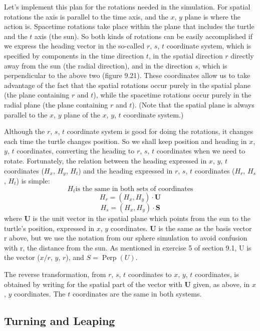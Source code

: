 \documentclass{book}
\begin{document}
Let's implement this plan for the rotations needed in the simulation.
For spatial rotations the axis is parallel to the time axis, and the $x$, $y$
plane is where the action is. Spacetime rotations take place within the
plane that includes the turtle and the $t$ axis (the sun). So both kinds of
rotations can be easily accomplished if we express the heading vector in
the so-called $r$, $s$, $t$ coordinate system, which is specified by components
in the time direction $t$, in the spatial direction $r$ directly away from the
sun (the radial direction), and in the direction $s$, which is perpendicular
to the above two (figure 9.21). These coordinates allow us to take advantage of the fact that the spatial rotations occur purely in the spatial
plane (the plane containing $r$ and $t$), while the spacetime rotations occur
purely in the radial plane (the plane containing $r$ and $t$). (Note that the
spatial plane is always parallel to the $x$, $y$ plane of the $x$, $y$, $t$ coordinate
system.)

Although the $r$, $s$, $t$ coordinate system is good for doing the rotations,
it changes each time the turtle changes position. So we shall keep
position and heading in $x$, $y$, $t$ coordinates, converting the heading to
$r$, $s$, $t$ coordinates when we need to rotate. Fortunately, the relation
between the heading expressed in $x$, $y$, $t$ coordinates ($H_x$, $H_y$, $H_t$) and
the heading expressed in $r$, $s$, $t$ coordinates ($H_r$, $H_s$, $H_t$) is simple:
$$H_t \text{is the same in both sets of coordinates}$$
$$H_r = (H_x, H_y) \cdot \mathbf{U}$$
$$H_s = (H_x, H_y) \cdot \mathbf{S}$$
where \textbf{U} is the unit vector in the spatial plane which points from the
sun to the turtle's position, expressed in $x$, $y$ coordinates. \textbf{U} is the same
as the basis vector r above, but we use the notation from our sphere
simulation to avoid confusion with r, the distance from the sun. As
mentioned in exercise 5 of section 9.1, U is the vector ($x/r$, $y$, $r$), and
$S = \operatorname{Perp}(U)$.

The reverse transformation, from $r$, $s$, $t$ coordinates to $x$, $y$, $t$ coordinates, is obtained by writing for the spatial part of the vector
with \textbf{U} given, as above, in $x$, $y$ coordinates. The $t$ coordinates are the
same in both systems.

\subsection{Turning and Leaping}
\end{document}
